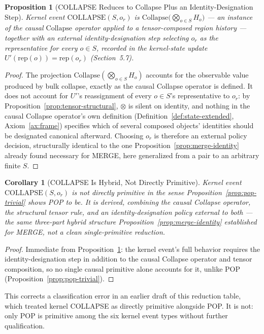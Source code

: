 \documentclass[11pt]{article}
\newtheorem{proposition}{Proposition}[section]
\newtheorem{corollary}{Corollary}[section]
\begin{document}
\begin{proposition}[COLLAPSE Reduces to Collapse Plus an Identity-Designation Step]
\label{prop:collapse-already}
Kernel event $\mathrm{COLLAPSE}(S, o_r)$ is $\mathrm{Collapse}\big(\bigotimes_{o \in S} H_o\big)$ --- an instance of the causal $\mathrm{Collapse}$ operator applied to a tensor-composed region history --- together with an external identity-designation step selecting $o_r$ as the representative for every $o \in S$, recorded in the kernel-state update $U'(\mathrm{rep}(o)) = \mathrm{rep}(o_r)$ (Section~5.7).
\end{proposition}
\begin{proof}
The projection $\mathrm{Collapse}(\bigotimes_{o\in S} H_o)$ accounts for the observable value produced by bulk collapse, exactly as the causal Collapse operator is defined. It does not account for $U'$'s reassignment of every $o \in S$'s representative to $o_r$: by Proposition~\ref{prop:tensor-structural}, $\otimes$ is silent on identity, and nothing in the causal Collapse operator's own definition (Definition~\ref{def:state-extended}, Axiom~\ref{ax:frame}) specifies which of several composed objects' identities should be designated canonical afterward. Choosing $o_r$ is therefore an external policy decision, structurally identical to the one Proposition~\ref{prop:merge-identity} already found necessary for MERGE, here generalized from a pair to an arbitrary finite $S$.
\end{proof}

\begin{corollary}[COLLAPSE Is Hybrid, Not Directly Primitive]
\label{cor:collapse-hybrid}
Kernel event $\mathrm{COLLAPSE}(S,o_r)$ is not directly primitive in the sense Proposition~\ref{prop:pop-trivial} shows POP to be. It is derived, combining the causal Collapse operator, the structural tensor rule, and an identity-designation policy external to both --- the same three-part hybrid structure Proposition~\ref{prop:merge-identity} established for MERGE, not a clean single-primitive reduction.
\end{corollary}
\begin{proof}
Immediate from Proposition~\ref{prop:collapse-already}: the kernel event's full behavior requires the identity-designation step in addition to the causal Collapse operator and tensor composition, so no single causal primitive alone accounts for it, unlike POP (Proposition~\ref{prop:pop-trivial}).
\end{proof}

This corrects a classification error in an earlier draft of this reduction table, which treated kernel COLLAPSE as directly primitive alongside POP. It is not: only POP is primitive among the six kernel event types without further qualification.
\end{document}
